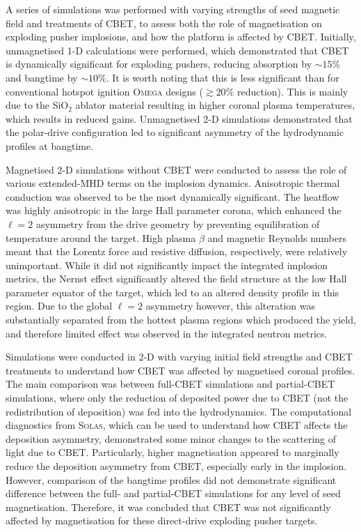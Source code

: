 A series of simulations was performed with varying strengths of seed magnetic field and treatments of \ac{CBET}, to assess both the role of magnetisation on exploding pusher implosions, and how the platform is affected by \ac{CBET}.
Initially, unmagnetised 1-D calculations were performed, which demonstrated that \ac{CBET} is dynamically significant for exploding pushers, reducing absorption by $\sim15\%$ and bangtime by $\sim10\%$.
It is worth noting that this is less significant than for conventional hotspot ignition \textsc{Omega} designs ($\gtrsim20\%$ reduction).
This is mainly due to the SiO$_2$ ablator material resulting in higher coronal plasma temperatures, which results in reduced gains.
Unmagnetised 2-D simulations demonstrated that the polar-drive configuration led to significant asymmetry of the hydrodynamic profiles at bangtime.

Magnetised 2-D simulations without \ac{CBET} were conducted to assess the role of various extended-\ac{MHD} terms on the implosion dynamics.
Anisotropic thermal conduction was observed to be the most dynamically significant.
The heatflow was highly anisotropic in the large Hall parameter corona, which enhanced the $\ell=2$ asymmetry from the drive geometry by preventing equilibration of temperature around the target.
High plasma $\beta$ and magnetic Reynolds numbers meant that the Lorentz force and resistive diffusion, respectively, were relatively unimportant.
While it did not significantly impact the integrated implosion metrics, the Nernst effect significantly altered the field structure at the low Hall parameter equator of the target, which led to an altered density profile in this region.
Due to the global $\ell=2$ asymmetry however, this alteration was substantially separated from the hottest plasma regions which produced the yield, and therefore limited effect was observed in the integrated neutron metrics.

Simulations were conducted in 2-D with varying initial field strengths and \ac{CBET} treatments to understand how \ac{CBET} was affected by magnetised coronal profiles.
The main comparison was between full-\ac{CBET} simulations and partial-\ac{CBET} simulations, where only the reduction of deposited power due to \ac{CBET} (not the redistribution of deposition) was fed into the hydrodynamics.
The computational diagnostics from \textsc{Solas}, which can be used to understand how \ac{CBET} affects the deposition asymmetry, demonstrated some minor changes to the scattering of light due to \ac{CBET}.
Particularly, higher magnetisation appeared to marginally reduce the deposition asymmetry from \ac{CBET}, especially early in the implosion.
However, comparison of the bangtime profiles did not demonstrate significant difference between the full- and partial-\ac{CBET} simulations for any level of seed magnetisation.
Therefore, it was concluded that \ac{CBET} was not significantly affected by magnetisation for these direct-drive exploding pusher targets.


